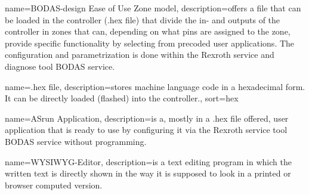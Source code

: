 {
    name={BODAS-design Ease of Use Zone model},
    description={offers a file that can be loaded in the controller (.hex file) that divide the in- and outputs of the controller in zones that can, depending on what pins are assigned to the zone, provide specific functionality by selecting from precoded user applications. The configuration and parametrization is done within the Rexroth service and diagnose tool BODAS service.}
}

{
    name={.hex file},
    description={stores machine language code in a hexadecimal form. It can be directly loaded (flashed) into the controller.\cite{Daga}},
    sort=hex
}

{
    name={ASrun Application},
    description={is a, mostly in a .hex file offered, user application that is ready to use by configuring it via the Rexroth service tool BODAS service without programming.}
}




{
    name={WYSIWYG-Editor},
    description={is a text editing program in which the written text is directly shown in the way it is supposed to look in a printed or browser computed version.}
}






